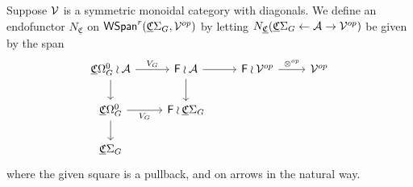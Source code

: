 \documentclass[a4paper,10pt
]{article}%
\newcommand{\UC}{\underline{\mathfrak C}}
\renewcommand{\1}{\ensuremath{\mathbb{id}}}
\begin{document}
\begin{definition}[{cf. \cite[Defn 4.16]{BP17}}]
      Suppose $\mathcal V$ is a symmetric monoidal category with diagonals.
      We define an endofunctor $N_{\UC}$ on $\mathsf{WSpan}^r(\UC\Sigma_G, \V^{op})$
      by letting $N_{\UC}(\UC\Sigma_G \leftarrow \mathcal A \to \V^{op})$ be given by the span
      \begin{equation}
            \begin{tikzcd}
                  \UC\Omega_G^0 \wr \mathcal A \arrow[d] \arrow[r, "V_G"]
                  &
                  \mathsf F \wr \mathcal A \arrow[d] \arrow[r]
                  &
                  \mathsf F \wr \V^{op} \arrow[r, "\otimes^{op}"]
                  &
                  \V^{op}
                  \\
                  \UC\Omega_G^0 \arrow[r, "V_G"'] \arrow[d]
                  &
                  \mathsf F \wr \UC\Sigma_G
                  \\
                  \UC\Sigma_G
            \end{tikzcd}
      \end{equation}
      where the given square is a pullback, and on arrows in the natural way.


\end{definition}
\end{document}
